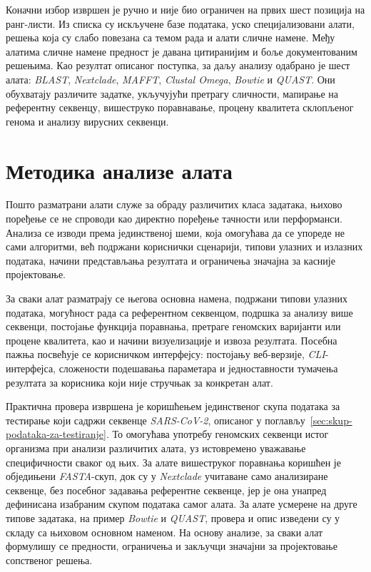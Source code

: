 \documentclass[12pt,oneside]{memoir}
\begin{document}
Коначни избор извршен је ручно и није био ограничен на првих шест позиција на ранг-листи. Из списка су искључене базе података, уско специјализовани алати, решења која су слабо повезана са темом рада и алати сличне намене. Међу алатима сличне намене предност је давана цитиранијим и боље документованим решењима. Као резултат описаног поступка, за даљу анализу одабрано је шест алата: \textit{BLAST}, \textit{Nextclade}, \textit{MAFFT}, \textit{Clustal Omega}, \textit{Bowtie} и \textit{QUAST}. Они обухватају различите задатке, укључујући претрагу сличности, мапирање на референтну секвенцу, вишеструко поравнавање, процену квалитета склопљеног генома и анализу вирусних секвенци.

\section{Методика анализе алата}
Пошто разматрани алати служе за обраду различитих класа задатака, њихово поређење се не спроводи као директно поређење тачности или перформанси. Анализа се изводи према јединственој шеми, која омогућава да се упореде не сами алгоритми, већ подржани кориснички сценарији, типови улазних и излазних података, начини представљања резултата и ограничења значајна за касније пројектовање.

За сваки алат разматрају се његова основна намена, подржани типови улазних података, могућност рада са референтном секвенцом, подршка за анализу више секвенци, постојање функција поравнања, претраге геномских варијанти или процене квалитета, као и начини визуелизације и извоза резултата. Посебна пажња посвећује се корисничком интерфејсу: постојању веб-верзије, \textit{CLI}-интерфејса, сложености подешавања параметара и једноставности тумачења резултата за корисника који није стручњак за конкретан алат.

Практична провера извршена је коришћењем јединственог скупа података за тестирање који садржи секвенце \textit{SARS-CoV-2}, описаног у поглављу~\ref{sec:skup-podataka-za-testiranje}. То омогућава употребу геномских секвенци истог организма при анализи различитих алата, уз истовремено уважавање специфичности сваког од њих. За алате вишеструког поравнања коришћен је обједињени \textit{FASTA}-скуп, док су у \textit{Nextclade} учитаване само анализиране секвенце, без посебног задавања референтне секвенце, јер је она унапред дефинисана изабраним скупом података самог алата. За алате усмерене на друге типове задатака, на пример \textit{Bowtie} и \textit{QUAST}, провера и опис изведени су у складу са њиховом основном наменом. На основу анализе, за сваки алат формулишу се предности, ограничења и закључци значајни за пројектовање сопственог решења.
\end{document}
